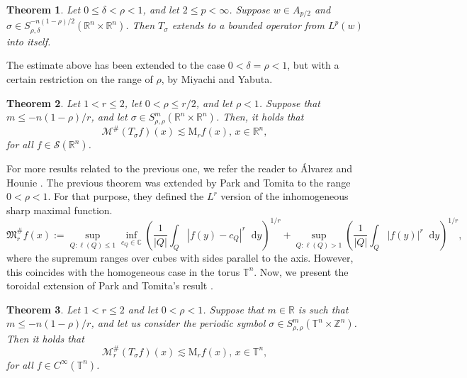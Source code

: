 \documentclass[12pt, reqno]{amsart}
\newtheorem{theorem}{Theorem}[section]
\theoremstyle{definition}
\theoremstyle{remark}
\numberwithin{equation}{section}
\newcommand*\diff{\mathop{}\!\mathrm{d}}
\begin{document}
\begin{theorem} \cite{chanillo-torchinsky}
    Let $0\leq \delta < \rho<1$, and let $2\leq p < \infty$. Suppose $w \in A_{p/2} $ and $\sigma \in S^{-n(1-\rho)/2}_{\rho,\delta} (\mathbb{R}^n\times \mathbb{R}^n)$. Then $T_\sigma$ extends to a bounded operator from $L^p(w)$ into itself. 
\end{theorem}

The estimate above has been extended to the case $0<\delta=\rho<1$, but with a certain restriction on the range of $\rho$, by Miyachi and Yabuta.

\begin{theorem} \cite{miyachi-yabuta}
    Let $1<r\leq 2$, let $0<\rho\leq r/2$, and let $\rho<1$. Suppose that $m\leq -n(1-\rho)/r $, and let $\sigma \in S^m_{\rho,\rho} (\mathbb{R}^n\times \mathbb{R}^n)$. Then, it holds that
    \begin{equation*}
        \mathcal{M}^\# (T_\sigma f)(x) \lesssim\mathrm{M}_rf(x), \,x\in \mathbb{R}^n,
    \end{equation*}
    for all $f \in \mathcal{S}(\mathbb{R}^n)$.
\end{theorem}
For more results related to the previous one, we refer the reader to \'Alvarez and Hounie \cite{alvarez-hounie}. The previous theorem was extended by Park and Tomita \cite{park-tomita} to the range $0<\rho<1$. For that purpose, they defined the $L^r$ version of the inhomogeneous sharp maximal function. 
\begin{equation*}
    \mathfrak{M}^\#_rf(x) := \sup_{Q:\ell(Q) \leq 1} \inf_{c_Q \in \mathbb{C}}\left(
        \frac{1}{|Q|} \int_Q |f(y) - c_Q|^r\diff y
        \right)^{1/r} + \sup_{Q:\ell(Q) > 1}\left(
        \frac{1}{|Q|} \int_Q |f(y)|^r\diff y
        \right)^{1/r},
\end{equation*}
where the supremum ranges over cubes with sides parallel to the axis. However, this coincides with the homogeneous case in the torus $\mathbb{T}^n$. Now, we present the toroidal extension of Park and Tomita's result \cite[Theorem~1.1]{park-tomita}. 

\begin{theorem}
    Let $1<r\leq 2$ and let $0<\rho<1$. Suppose that $m\in \mathbb{R}$ is such that $m\leq-n(1-\rho)/r$, and let us consider the periodic symbol $\sigma \in S^m_{\rho,\rho}(\mathbb{T}^n \times \mathbb{Z}^n)  $. Then it holds that 
    \begin{equation*}
        \mathcal{M}^\#_r(T_\sigma f)(x) \lesssim\mathrm{M}_r f(x),\,x\in \mathbb{T}^n,
    \end{equation*}
    for all $f \in C^\infty(\mathbb{T}^n)$.
    \label{theo:main1}
\end{theorem}
\end{document}
